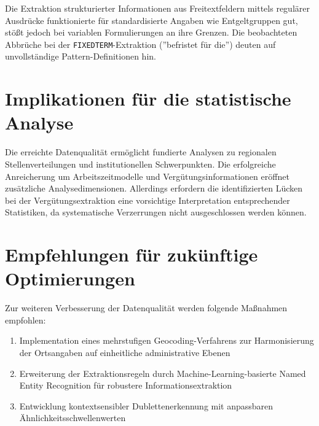 \documentclass[
    a4paper,
    12pt,
    headinclude=true,
    BCOR=10mm,
]{scrreprt}
\begin{document}
Die Extraktion strukturierter Informationen aus Freitextfeldern mittels regulärer Ausdrücke funktionierte für standardisierte Angaben wie Entgeltgruppen gut, stößt jedoch bei variablen Formulierungen an ihre Grenzen. Die beobachteten Abbrüche bei der \texttt{FIXEDTERM}-Extraktion (''befristet für die'') deuten auf unvollständige Pattern-Definitionen hin.

\section{Implikationen für die statistische Analyse}
Die erreichte Datenqualität ermöglicht fundierte Analysen zu regionalen Stellenverteilungen und institutionellen Schwerpunkten. Die erfolgreiche Anreicherung um Arbeitszeitmodelle und Vergütungsinformationen eröffnet zusätzliche Analysedimensionen. Allerdings erfordern die identifizierten Lücken bei der Vergütungsextraktion eine vorsichtige Interpretation entsprechender Statistiken, da systematische Verzerrungen nicht ausgeschlossen werden können.

\section{Empfehlungen für zukünftige Optimierungen}
Zur weiteren Verbesserung der Datenqualität werden folgende Maßnahmen empfohlen:
\begin{enumerate}
\item Implementation eines mehrstufigen Geocoding-Verfahrens zur Harmonisierung der Ortsangaben auf einheitliche administrative Ebenen
\item Erweiterung der Extraktionsregeln durch Machine-Learning-basierte Named Entity Recognition für robustere Informationsextraktion
\item Entwicklung kontextsensibler Dublettenerkennung mit anpassbaren Ähnlichkeitsschwellenwerten
\end{enumerate}

\printbibliography

\newpage
{}
\end{document}
